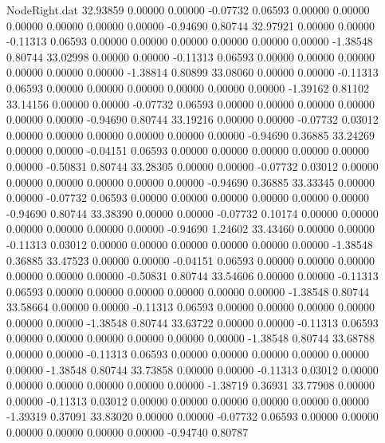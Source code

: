 \begin{filecontents}{NodeRight.dat}
  32.93859    0.00000    0.00000    -0.07732    0.06593    0.00000    0.00000    0.00000    0.00000    0.00000    0.00000   -0.94690    0.80744
  32.97921    0.00000    0.00000    -0.11313    0.06593    0.00000    0.00000    0.00000    0.00000    0.00000    0.00000   -1.38548    0.80744
  33.02998    0.00000    0.00000    -0.11313    0.06593    0.00000    0.00000    0.00000    0.00000    0.00000    0.00000   -1.38814    0.80899
  33.08060    0.00000    0.00000    -0.11313    0.06593    0.00000    0.00000    0.00000    0.00000    0.00000    0.00000   -1.39162    0.81102
  33.14156    0.00000    0.00000    -0.07732    0.06593    0.00000    0.00000    0.00000    0.00000    0.00000    0.00000   -0.94690    0.80744
  33.19216    0.00000    0.00000    -0.07732    0.03012    0.00000    0.00000    0.00000    0.00000    0.00000    0.00000   -0.94690    0.36885
  33.24269    0.00000    0.00000    -0.04151    0.06593    0.00000    0.00000    0.00000    0.00000    0.00000    0.00000   -0.50831    0.80744
  33.28305    0.00000    0.00000    -0.07732    0.03012    0.00000    0.00000    0.00000    0.00000    0.00000    0.00000   -0.94690    0.36885
  33.33345    0.00000    0.00000    -0.07732    0.06593    0.00000    0.00000    0.00000    0.00000    0.00000    0.00000   -0.94690    0.80744
  33.38390    0.00000    0.00000    -0.07732    0.10174    0.00000    0.00000    0.00000    0.00000    0.00000    0.00000   -0.94690    1.24602
  33.43460    0.00000    0.00000    -0.11313    0.03012    0.00000    0.00000    0.00000    0.00000    0.00000    0.00000   -1.38548    0.36885
  33.47523    0.00000    0.00000    -0.04151    0.06593    0.00000    0.00000    0.00000    0.00000    0.00000    0.00000   -0.50831    0.80744
  33.54606    0.00000    0.00000    -0.11313    0.06593    0.00000    0.00000    0.00000    0.00000    0.00000    0.00000   -1.38548    0.80744
  33.58664    0.00000    0.00000    -0.11313    0.06593    0.00000    0.00000    0.00000    0.00000    0.00000    0.00000   -1.38548    0.80744
  33.63722    0.00000    0.00000    -0.11313    0.06593    0.00000    0.00000    0.00000    0.00000    0.00000    0.00000   -1.38548    0.80744
  33.68788    0.00000    0.00000    -0.11313    0.06593    0.00000    0.00000    0.00000    0.00000    0.00000    0.00000   -1.38548    0.80744
  33.73858    0.00000    0.00000    -0.11313    0.03012    0.00000    0.00000    0.00000    0.00000    0.00000    0.00000   -1.38719    0.36931
  33.77908    0.00000    0.00000    -0.11313    0.03012    0.00000    0.00000    0.00000    0.00000    0.00000    0.00000   -1.39319    0.37091
  33.83020    0.00000    0.00000    -0.07732    0.06593    0.00000    0.00000    0.00000    0.00000    0.00000    0.00000   -0.94740    0.80787

\end{filecontents}
